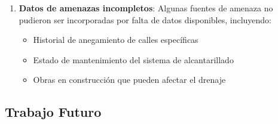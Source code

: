 \documentclass[conference]{IEEEtran}
\begin{document}
\begin{enumerate}
    \item \textbf{Datos de amenazas incompletos}: Algunas fuentes de amenaza no pudieron ser incorporadas por falta de datos disponibles, incluyendo:
    \begin{itemize}
        \item Historial de anegamiento de calles específicas
        \item Estado de mantenimiento del sistema de alcantarillado
        \item Obras en construcción que pueden afectar el drenaje
    \end{itemize}
\end{enumerate}

\subsection{Trabajo Futuro}
\end{document}
